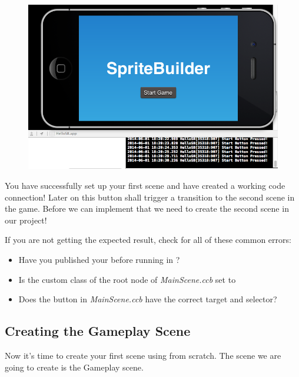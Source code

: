 \begin{figure}[H]
		\centering
		\includegraphics[width=0.9\linewidth]{images/firstproject/button_success_log.png}
\end{figure}

You have successfully set up your first \SB{} scene and have created a working
code connection! Later on this button shall trigger a transition to the second
scene in the game. Before we can implement that we need to create the second
scene in our \SB{} project!

\begin{error}
If you are not getting the expected result, check for all of these common
errors:
\begin{itemize}
  \item Have you published your \SB{} before running in \xcode{}?
  \item Is the custom class of the root node of \textit{MainScene.ccb} set to
  \item Does the button in \textit{MainScene.ccb} have the correct target and
  selector?
\end{itemize}
\end{error}

\subsection{Creating the Gameplay Scene}
Now it's time to create your first scene using \SB{} from scratch. The scene we
are going to create is the Gameplay scene. 

